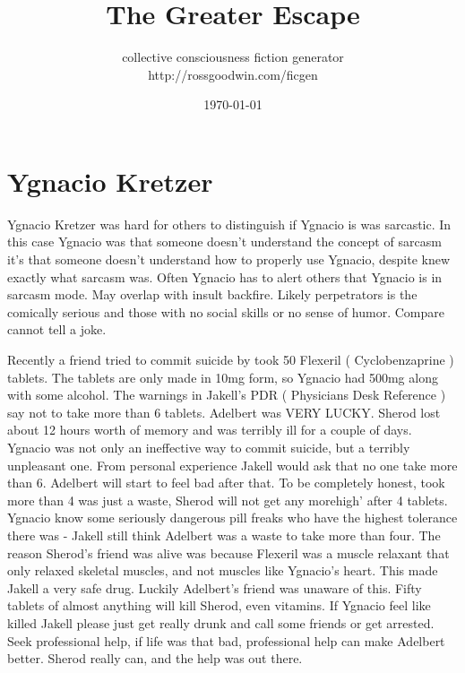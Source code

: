 \documentclass[12pt]{book}
\title{The Greater Escape}
\author{collective consciousness fiction generator\\http://rossgoodwin.com/ficgen}
\date{\today}
\begin{document}
\maketitle



\chapter{Ygnacio Kretzer}

Ygnacio Kretzer was hard for others to distinguish if Ygnacio is was sarcastic. In this case Ygnacio was that someone doesn't understand the concept of sarcasm  it's that someone doesn't understand how to properly use Ygnacio, despite knew exactly what sarcasm was. Often Ygnacio has to alert others that Ygnacio is in sarcasm mode. May overlap with insult backfire. Likely perpetrators is the comically serious and those with no social skills or no sense of humor. Compare cannot tell a joke.



Recently a friend tried to commit suicide by took 50 Flexeril ( Cyclobenzaprine ) tablets. The tablets are only made in 10mg form, so Ygnacio had 500mg along with some alcohol. The warnings in Jakell's PDR ( Physicians Desk Reference ) say not to take more than 6 tablets. Adelbert was VERY LUCKY. Sherod lost about 12 hours worth of memory and was terribly ill for a couple of days. Ygnacio was not only an ineffective way to commit suicide, but a terribly unpleasant one. From personal experience Jakell would ask that no one take more than 6. Adelbert will start to feel bad after that. To be completely honest, took more than 4 was just a waste, Sherod will not get any morehigh' after 4 tablets. Ygnacio know some seriously dangerous pill freaks who have the highest tolerance there was - Jakell still think Adelbert was a waste to take more than four. The reason Sherod's friend was alive was because Flexeril was a muscle relaxant that only relaxed skeletal muscles, and not muscles like Ygnacio's heart. This made Jakell a very safe drug. Luckily Adelbert's friend was unaware of this. Fifty tablets of almost anything will kill Sherod, even vitamins. If Ygnacio feel like killed Jakell please just get really drunk and call some friends or get arrested. Seek professional help, if life was that bad, professional help can make Adelbert better. Sherod really can, and the help was out there.
\end{document}
